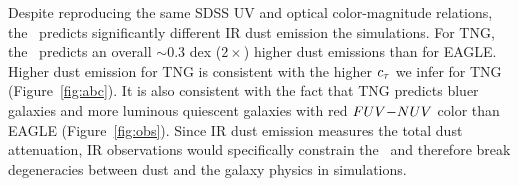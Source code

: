 Despite reproducing the same SDSS UV and optical color-magnitude relations, the
\eda~predicts significantly different IR dust emission the simulations.
For TNG, the \eda~predicts an overall ${\sim}0.3$ dex ($2\times$) higher dust
emissions than for EAGLE. Higher dust emission for TNG
is consistent with the higher $c_\tau$ we infer for TNG (Figure~\ref{fig:abc}).
It is also consistent with the fact that TNG predicts bluer galaxies and more
luminous quiescent galaxies with red $FUV{-}NUV$ color than EAGLE
(Figure~\ref{fig:obs}). Since IR dust emission measures the total dust
attenuation, IR observations would specifically constrain the \eda~and
therefore break degeneracies between dust and the galaxy physics in simulations.




